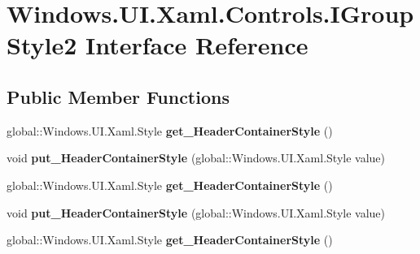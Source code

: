 \hypertarget{interface_windows_1_1_u_i_1_1_xaml_1_1_controls_1_1_i_group_style2}{}\section{Windows.\+U\+I.\+Xaml.\+Controls.\+I\+Group\+Style2 Interface Reference}
\label{interface_windows_1_1_u_i_1_1_xaml_1_1_controls_1_1_i_group_style2}
\subsection*{Public Member Functions}
\begin{DoxyCompactItemize}
\item 
\mbox{\label{interface_windows_1_1_u_i_1_1_xaml_1_1_controls_1_1_i_group_style2_a2c6805d01c81929429b03b0ac0b70db1}} 
global\+::\+Windows.\+U\+I.\+Xaml.\+Style {\bfseries get\+\_\+\+Header\+Container\+Style} ()
\item 
\mbox{\label{interface_windows_1_1_u_i_1_1_xaml_1_1_controls_1_1_i_group_style2_a72375c64441c2b8ec3635acc1a543f48}} 
void {\bfseries put\+\_\+\+Header\+Container\+Style} (global\+::\+Windows.\+U\+I.\+Xaml.\+Style value)
\item 
\mbox{\label{interface_windows_1_1_u_i_1_1_xaml_1_1_controls_1_1_i_group_style2_a2c6805d01c81929429b03b0ac0b70db1}} 
global\+::\+Windows.\+U\+I.\+Xaml.\+Style {\bfseries get\+\_\+\+Header\+Container\+Style} ()
\item 
\mbox{\label{interface_windows_1_1_u_i_1_1_xaml_1_1_controls_1_1_i_group_style2_a72375c64441c2b8ec3635acc1a543f48}} 
void {\bfseries put\+\_\+\+Header\+Container\+Style} (global\+::\+Windows.\+U\+I.\+Xaml.\+Style value)
\item 
\mbox{\label{interface_windows_1_1_u_i_1_1_xaml_1_1_controls_1_1_i_group_style2_a2c6805d01c81929429b03b0ac0b70db1}} 
global\+::\+Windows.\+U\+I.\+Xaml.\+Style {\bfseries get\+\_\+\+Header\+Container\+Style} ()

\end{DoxyCompactItemize}
